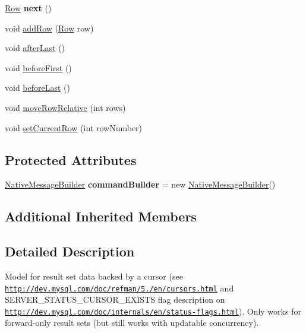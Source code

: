 \begin{DoxyCompactItemize}
\mbox{\hyperlink{interfacecom_1_1mysql_1_1cj_1_1result_1_1_row}{Row}} {\bfseries next} ()
\item 
void \mbox{\hyperlink{classcom_1_1mysql_1_1cj_1_1protocol_1_1a_1_1result_1_1_resultset_rows_cursor_a34e3f6465619fc988b570afca93db969}{add\+Row}} (\mbox{\hyperlink{interfacecom_1_1mysql_1_1cj_1_1result_1_1_row}{Row}} row)
\item 
void \mbox{\hyperlink{classcom_1_1mysql_1_1cj_1_1protocol_1_1a_1_1result_1_1_resultset_rows_cursor_a1fc9c638ba70a1fd6cabeb6ba0a2b0fe}{after\+Last}} ()
\item 
void \mbox{\hyperlink{classcom_1_1mysql_1_1cj_1_1protocol_1_1a_1_1result_1_1_resultset_rows_cursor_a3f7a11c46baddfde2c6ad5cc16c101d7}{before\+First}} ()
\item 
void \mbox{\hyperlink{classcom_1_1mysql_1_1cj_1_1protocol_1_1a_1_1result_1_1_resultset_rows_cursor_ad9ecb4a99d00c5fc3c2ada068b3d78e3}{before\+Last}} ()
\item 
void \mbox{\hyperlink{classcom_1_1mysql_1_1cj_1_1protocol_1_1a_1_1result_1_1_resultset_rows_cursor_af4a1433311e5089d29b554c81d0b006c}{move\+Row\+Relative}} (int rows)
\item 
void \mbox{\hyperlink{classcom_1_1mysql_1_1cj_1_1protocol_1_1a_1_1result_1_1_resultset_rows_cursor_aab53d9374408ceaf15369f0b515ab56e}{set\+Current\+Row}} (int row\+Number)
\end{DoxyCompactItemize}
\subsection*{Protected Attributes}
\begin{DoxyCompactItemize}
\item 
\mbox{\label{classcom_1_1mysql_1_1cj_1_1protocol_1_1a_1_1result_1_1_resultset_rows_cursor_a2873f0677be47b53bf5adec00d6719cc}} 
\mbox{\hyperlink{classcom_1_1mysql_1_1cj_1_1protocol_1_1a_1_1_native_message_builder}{Native\+Message\+Builder}} {\bfseries command\+Builder} = new \mbox{\hyperlink{classcom_1_1mysql_1_1cj_1_1protocol_1_1a_1_1_native_message_builder}{Native\+Message\+Builder}}()
\end{DoxyCompactItemize}
\subsection*{Additional Inherited Members}


\subsection{Detailed Description}
Model for result set data backed by a cursor (see \href{http://dev.mysql.com/doc/refman/5.7/en/cursors.html}{\tt http\+://dev.\+mysql.\+com/doc/refman/5./en/cursors.\+html} and S\+E\+R\+V\+E\+R\+\_\+\+S\+T\+A\+T\+U\+S\+\_\+\+C\+U\+R\+S\+O\+R\+\_\+\+E\+X\+I\+S\+TS flag description on \href{http://dev.mysql.com/doc/internals/en/status-flags.html}{\tt http\+://dev.\+mysql.\+com/doc/internals/en/status-\/flags.\+html}). Only works for forward-\/only result sets (but still works with updatable concurrency). 


